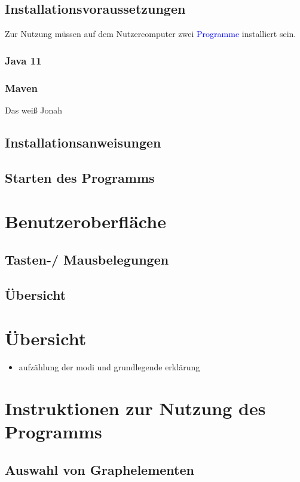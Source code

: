 \documentclass[enabledeprecatedfontcommands,fontsize=11pt,paper=a4,twoside]{scrartcl}
\newcommand*{\blue}{\textcolor{blue}}
\newcounter{one}
\begin{document}
	\subsection{Installationsvoraussetzungen}

	Zur Nutzung müssen auf dem Nutzercomputer zwei \blue{Programme} installiert sein.

	\subsubsection{Java 11}
	\subsubsection{Maven}
	Das weiß Jonah

	\subsection{Installationsanweisungen}
	\subsection{Starten des Programms}
\section{Benutzeroberfläche}
	\subsection{Tasten-/ Mausbelegungen}
	\subsection{Übersicht}
	
	
\section{Übersicht} \label{sec:uebersicht}
\begin{itemize}
	\item aufzählung der modi und grundlegende erklärung
\end{itemize}


\section{Instruktionen zur Nutzung des Programms} \label{sec:nutzung}
	\subsection{Auswahl von Graphelementen}
\end{document}
